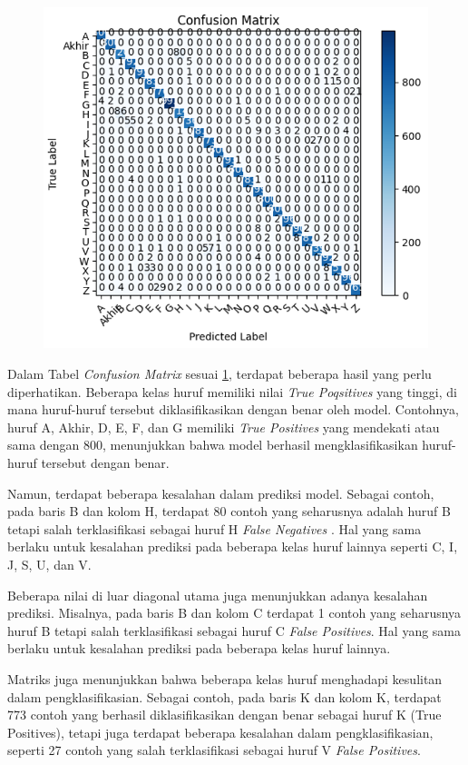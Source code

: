 \begin{figure}[!hbt]
	\centering
	\includegraphics[width=0.7\linewidth]{gambar/bener/ConfusionMatrix_ModelCNNResNet50V2.png}
	\label{fig:TabelModelCNNResNet50v2}
\end{figure}
Dalam Tabel \textit{Confusion Matrix} sesuai \ref{fig:TabelModelCNNResNet50v2}, terdapat beberapa hasil yang perlu diperhatikan. Beberapa kelas huruf memiliki nilai \textit{True Poqsitives } yang tinggi, di mana huruf-huruf tersebut diklasifikasikan dengan benar oleh model. Contohnya, huruf A, Akhir, D, E, F, dan G memiliki \textit{True Positives} yang mendekati atau sama dengan 800, menunjukkan bahwa model berhasil mengklasifikasikan huruf-huruf tersebut dengan benar.

Namun, terdapat beberapa kesalahan dalam prediksi model. Sebagai contoh, pada baris B dan kolom H, terdapat 80 contoh yang seharusnya adalah huruf B tetapi salah terklasifikasi sebagai huruf H \textit{False Negatives} . Hal yang sama berlaku untuk kesalahan prediksi pada beberapa kelas huruf lainnya seperti C, I, J, S, U, dan V.

Beberapa nilai di luar diagonal utama juga menunjukkan adanya kesalahan prediksi. Misalnya, pada baris B dan kolom C terdapat 1 contoh yang seharusnya huruf B tetapi salah terklasifikasi sebagai huruf C \textit{False Positives}. Hal yang sama berlaku untuk kesalahan prediksi pada beberapa kelas huruf lainnya.

Matriks juga menunjukkan bahwa beberapa kelas huruf menghadapi kesulitan dalam pengklasifikasian. Sebagai contoh, pada baris K dan kolom K, terdapat 773 contoh yang berhasil diklasifikasikan dengan benar sebagai huruf K (True Positives), tetapi juga terdapat beberapa kesalahan dalam pengklasifikasian, seperti 27 contoh yang salah terklasifikasi sebagai huruf V \textit{False Positives}.

